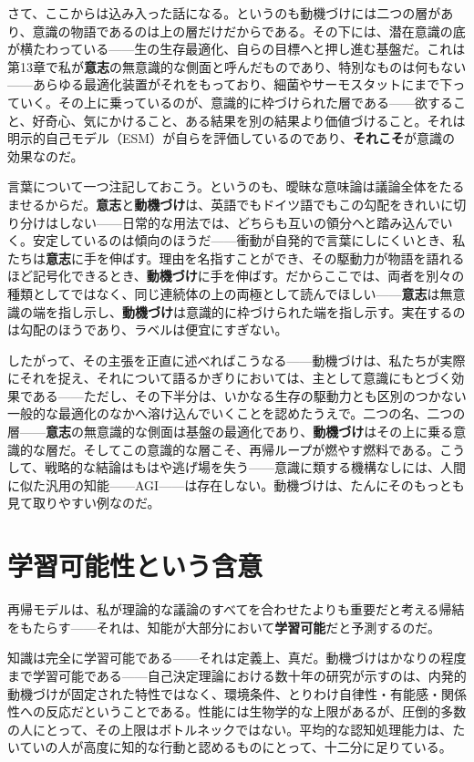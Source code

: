 \documentclass[11pt, twoside, openright]{book}
\begin{document}
さて、ここからは込み入った話になる。というのも動機づけには二つの層があり、意識の物語であるのは上の層だけだからである。その下には、潜在意識の底が横たわっている------生の生存最適化、自らの目標へと押し進む基盤だ。これは第13章で私が\textbf{意志}の無意識的な側面と呼んだものであり、特別なものは何もない------あらゆる最適化装置がそれをもっており、細菌やサーモスタットにまで下っていく。その上に乗っているのが、意識的に枠づけられた層である------欲すること、好奇心、気にかけること、ある結果を別の結果より価値づけること。それは明示的自己モデル（ESM）が自らを評価しているのであり、\textbf{それこそ}が意識の効果なのだ。

言葉について一つ注記しておこう。というのも、曖昧な意味論は議論全体をたるませるからだ。\textbf{意志}と\textbf{動機づけ}は、英語でもドイツ語でもこの勾配をきれいに切り分けはしない------日常的な用法では、どちらも互いの領分へと踏み込んでいく。安定しているのは傾向のほうだ------衝動が自発的で言葉にしにくいとき、私たちは\textbf{意志}に手を伸ばす。理由を名指すことができ、その駆動力が物語を語れるほど記号化できるとき、\textbf{動機づけ}に手を伸ばす。だからここでは、両者を別々の種類としてではなく、同じ連続体の上の両極として読んでほしい------\textbf{意志}は無意識の端を指し示し、\textbf{動機づけ}は意識的に枠づけられた端を指し示す。実在するのは勾配のほうであり、ラベルは便宜にすぎない。

したがって、その主張を正直に述べればこうなる------動機づけは、私たちが実際にそれを捉え、それについて語るかぎりにおいては、主として意識にもとづく効果である------ただし、その下半分は、いかなる生存の駆動力とも区別のつかない一般的な最適化のなかへ溶け込んでいくことを認めたうえで。二つの名、二つの層------\textbf{意志}の無意識的な側面は基盤の最適化であり、\textbf{動機づけ}はその上に乗る意識的な層だ。そしてこの意識的な層こそ、再帰ループが燃やす燃料である。こうして、戦略的な結論はもはや逃げ場を失う------意識に類する機構なしには、人間に似た汎用の知能------AGI------は存在しない。動機づけは、たんにそのもっとも見て取りやすい例なのだ。

\section*{学習可能性という含意}

再帰モデルは、私が理論的な議論のすべてを合わせたよりも重要だと考える帰結をもたらす------それは、知能が大部分において\textbf{学習可能}だと予測するのだ。

知識は完全に学習可能である------それは定義上、真だ。動機づけはかなりの程度まで学習可能である------自己決定理論における数十年の研究が示すのは、内発的動機づけが固定された特性ではなく、環境条件、とりわけ自律性・有能感・関係性への反応だということである。性能には生物学的な上限があるが、圧倒的多数の人にとって、その上限はボトルネックではない。平均的な認知処理能力は、たいていの人が高度に知的な行動と認めるものにとって、十二分に足りている。
\end{document}
